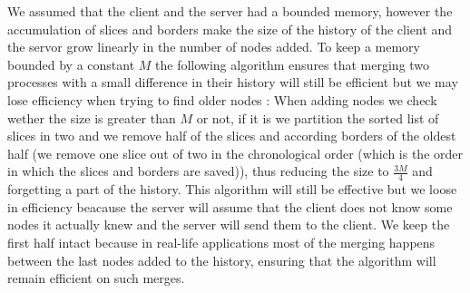 We assumed that the client and the server had a bounded memory, however the accumulation of slices and borders make the size of the history of the client and the servor grow linearly in the number of nodes added. To keep a memory bounded by a constant $M$ the following algorithm ensures that merging two processes with a small difference in their history will still be efficient but we may lose efficiency when trying to find older nodes : When adding nodes we check wether the size is greater than $M$ or not, if it is we partition the sorted list of slices in two and we remove half of the slices and according borders of the oldest half (we remove one slice out of two in the chronological order (which is the order in which the slices and borders are saved)), thus reducing the size to $\frac{3M}{4}$ and forgetting a part of the history. This algorithm will still be effective but we loose in efficiency beacause the server will assume that the client does not know some nodes it actually knew and the server will 
send them to the client. We keep the first half intact because in real-life applications most of the merging happens between the last nodes added to the history, ensuring that the algorithm will remain efficient on such merges.